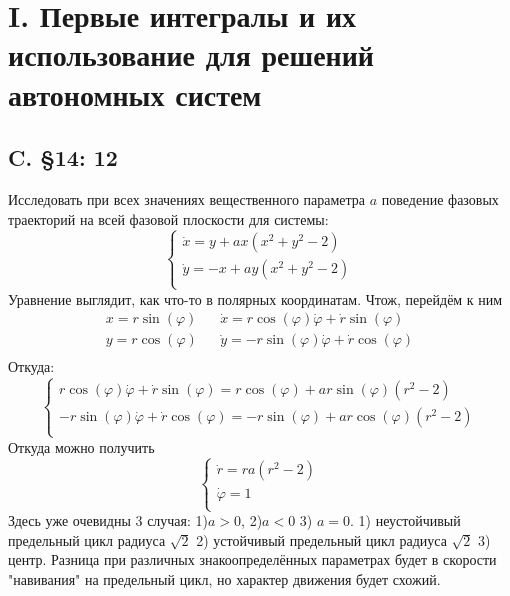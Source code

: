 \documentclass{article}
\begin{document}
\section{I. Первые интегралы и их использование для решений автономных систем}
\subsection{C. \S14: 12}
Исследовать при всех значениях вещественного параметра $a$ поведение фазовых траекторий на всей фазовой плоскости для системы:
\begin{equation}
    \begin{cases}
       \dot{x} = y + ax(x^2 + y^2 - 2)\\
        \dot{y} = - x + ay(x^2 + y^2 - 2)\\
    \end{cases}
\end{equation}
Уравнение выглядит, как что-то в полярных координатам. Чтож, перейдём к ним 
\begin{align*}
x = r \sin{(\varphi)}&&\dot{x} = r \cos {(\varphi)} \dot{\varphi} + \dot{r} \sin {(\varphi )} \\ 
y = r \cos{(\varphi)}&&\dot{y} = -r \sin {(\varphi)} \dot{\varphi} + \dot{r} \cos {(\varphi )} \\ 
\end{align*}
Откуда:
\begin{equation*}
    \begin{cases}
       r \cos {(\varphi)} \dot{\varphi} + \dot{r} \sin {(\varphi )} = r \cos{(\varphi)} + ar \sin{(\varphi)}(r^2 - 2)\\  
      -r \sin {(\varphi)} \dot{\varphi} + \dot{r} \cos {(\varphi )} = -r \sin{(\varphi)} + ar \cos{(\varphi)}(r^2 - 2)\\
    \end{cases}
\end{equation*}
Откуда можно получить 
\begin{equation*}
\begin{cases}
    \dot{r}=ra(r^2-2)\\
    \dot{\varphi}=1\\
        \end{cases}
\end{equation*}
Здесь уже очевидны 3 случая: 1)$a>0$, 2)$a<0$ 3) $a=0$. 1) неустойчивый предельный цикл радиуса $\sqrt 2$ 2) устойчивый 
предельный цикл радиуса $\sqrt 2$  3) центр. Разница при различных знакоопределённых параметрах будет в скорости "навивания" на предельный цикл, но характер движения будет схожий.\\
\end{document}
